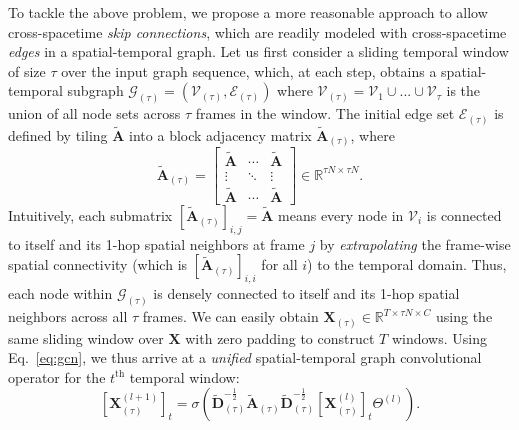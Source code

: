 \documentclass[10pt,twocolumn,letterpaper]{article}
\makeatletter
\renewcommand{\paragraph}{\@startsection{paragraph}{4}{\z@}{1.5ex \@plus 1ex \@minus .2ex}{-1em}{\normalfont\normalsize\bfseries}}
\makeatother
\begin{document}
To tackle the above problem, we propose a more reasonable approach to allow cross-spacetime \textit{skip connections}, which are readily modeled with cross-spacetime \textit{edges} in a spatial-temporal graph.
Let us first consider a sliding temporal window of size $\tau$ over the input graph sequence, which, at each step, obtains a spatial-temporal subgraph $\mathcal{G}_{(\tau)} = (\mathcal{V}_{(\tau)}, \mathcal{E}_{(\tau)})$ where
$\mathcal{V}_{(\tau)} = \mathcal{V}_1 \cup ... \cup \mathcal{V}_\tau$ is the union of all node sets across $\tau$ frames in the window.
The initial edge set $\mathcal{E}_{(\tau)}$ is defined by tiling $\tilde{\mathbf{A}}$ into a block adjacency matrix $\tilde{\mathbf{A}}_{(\tau)}$, where
\begin{equation} \label{eq:g3d-graph-definition}
    \tilde{\mathbf{A}}_{(\tau)}
    = \left[
        \begin{array}{ccc}
            {\tilde{\mathbf{A}}} & {\cdots} & {\tilde{\mathbf{A}}} \\
            {\vdots} & {\ddots} & {\vdots} \\
            {\tilde{\mathbf{A}}} & {\cdots} & {\tilde{\mathbf{A}}}
        \end{array}
    \right] \in \mathbb{R}^{\tau N \times \tau N}.
\end{equation}
Intuitively, each submatrix $[\tilde{\mathbf{A}}_{(\tau)}]_{i,j} = \tilde{\mathbf{A}}$ means every node in $\mathcal{V}_i$ is connected to itself and its 1-hop spatial neighbors at frame $j$ by \textit{extrapolating} the frame-wise spatial connectivity (which is $[\tilde{\mathbf{A}}_{(\tau)}]_{i,i}$ for all $i$) to the temporal domain.
Thus, each node within $\mathcal{G}_{(\tau)}$ is densely connected to itself and its 1-hop spatial neighbors across all $\tau$ frames.
We can easily obtain $\mathbf{X}_{(\tau)} \in \mathbb{R}^{T\times \tau N \times C}$ using the same sliding window over $\mathbf{X}$ with zero padding to construct $T$ windows.
Using Eq.~\ref{eq:gcn}, we thus arrive at a \textit{unified} spatial-temporal graph convolutional operator for the $t^\text{th}$ temporal window:
\begin{equation} \label{eq:g3d-update-rule}
    [\mathbf{X}_{(\tau)}^{(l+1)}]_t = \sigma\left(
        \tilde{\mathbf{D}}_{(\tau)}^{-\frac{1}{2}}
        \tilde{\mathbf{A}}_{(\tau)}
        \tilde{\mathbf{D}}_{(\tau)}^{-\frac{1}{2}}
        [\mathbf{X}_{(\tau)}^{(l)}]_t
        \Theta^{(l)}
    \right).
\end{equation}

\paragraph{Dilated Windows.}
\end{document}
